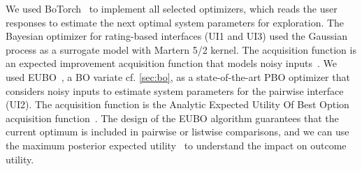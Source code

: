 \documentclass[acmsmall,screen,nonacm]{acmart}
\begin{document}
We used BoTorch~\cite{balandat2020botorch} to implement all selected optimizers, which reads the user responses to estimate the next optimal system parameters for exploration. The Bayesian optimizer for rating-based interfaces (UI1 and UI3) used the Gaussian process as a surrogate model with Martern 5/2 kernel. The acquisition function is an expected improvement acquisition function that models noisy inputs~\cite{letham2019constrained}.
%
We used EUBO~\cite{lin2022preference}, a BO variate cf. \autoref{sec:bo}, as a state-of-the-art PBO optimizer that considers noisy inputs to estimate system parameters for the pairwise interface (UI2). The acquisition function is the Analytic Expected Utility Of Best Option acquisition function~\cite{lin2022preference}.
The design of the EUBO algorithm guarantees that the current optimum is included in pairwise or listwise comparisons, and we can use the maximum posterior expected utility~\cite{chu2005preference} to understand the impact on outcome utility.
\end{document}
